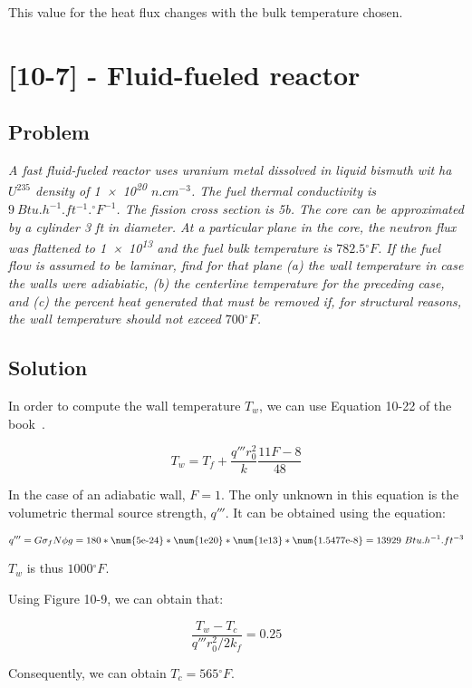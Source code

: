 This value for the heat flux changes with the bulk temperature chosen.

\section{[10-7] - Fluid-fueled reactor}
\label{prob102}


\subsection{Problem}
\textit{A fast fluid-fueled reactor uses uranium metal dissolved in liquid bismuth wit ha $U^{235}$ density of \num{1e20} $n.cm^{-3}$. The fuel thermal conductivity is $9\ Btu.h^{-1}.ft^{-1}.{}^\circ F^{-1}$. The fission cross section is 5b. The core can be approximated by a cylinder 3 ft in diameter. At a particular plane in the core, the neutron flux was flattened to \num{1e13} and the fuel bulk temperature is $782.5{}^\circ F$. If the fuel flow is assumed to be laminar, find for that plane (a) the wall temperature in case the walls were adiabiatic, (b) the centerline temperature for the preceding case, and (c) the percent heat generated that must be removed if, for structural reasons, the wall temperature should not exceed $700{}^\circ F$.}

\subsection{Solution}


In order to compute the wall temperature $T_w$, we can use Equation 10-22 of the book~\cite{book01}.

\begin{equation}
T_w = T_f + \frac{q'''r_0^2}{k}\frac{11F-8}{48}
\end{equation}

In the case of an adiabatic wall, $F = 1$. The only unknown in this equation is the volumetric thermal source strength, $q'''$. It can be obtained using the equation:

\begin{equation}
q''' = G \sigma_f N \phi g = 180 * \text{\num{5e-24}} * \text{\num{1e20}} * \text{\num{1e13}} * \text{\num{1.5477e-8}} = 13929\ Btu.h^{-1}.ft^{-3}
\end{equation}

$T_w$ is thus $1000{}^\circ F$.

Using Figure 10-9, we can obtain that:

\begin{equation}
\frac{T_w - T_c}{q'''r_0^2/2k_f} = 0.25
\end{equation}

Consequently, we can obtain $T_c = 565{}^\circ F$.
